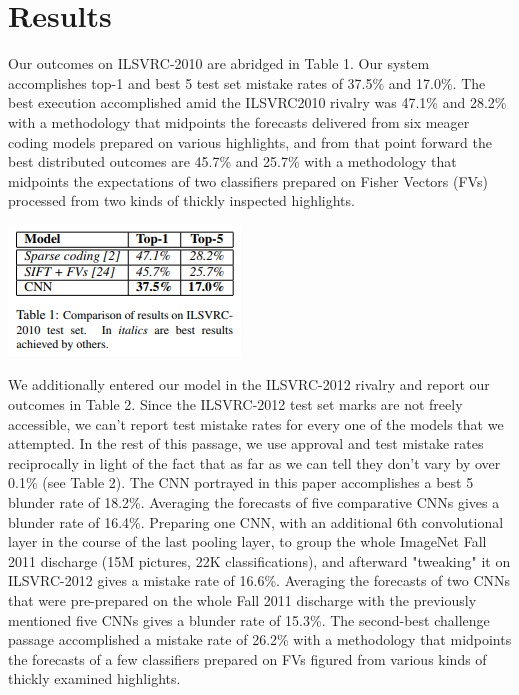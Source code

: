 \documentclass[12pt]{article}
\begin{document}
\section*{Results}
\hspace*{10mm}Our outcomes on ILSVRC-2010 are abridged in Table 1. Our system accomplishes top-1 and best 5 test set mistake rates of 37.5\% and 17.0\%. The best execution accomplished amid the ILSVRC2010 rivalry was 47.1\% and 28.2\% with a methodology that midpoints the forecasts delivered from six meager coding models prepared on various highlights, and from that point forward the best distributed outcomes are 45.7\% and 25.7\% with a methodology that midpoints the expectations of two classifiers prepared on Fisher Vectors (FVs) processed from two kinds of thickly inspected highlights.
\begin{center}
\includegraphics[scale=1]{t1}
\end{center}
\hspace*{10mm}We additionally entered our model in the ILSVRC-2012 rivalry and report our outcomes in Table 2. Since the ILSVRC-2012 test set marks are not freely accessible, we can't report test mistake rates for every one of the models that we attempted. In the rest of this passage, we use approval and test mistake rates reciprocally in light of the fact that as far as we can tell they don't vary by over 0.1\% (see Table 2). The CNN portrayed in this paper accomplishes a best 5 blunder rate of 18.2\%. Averaging the forecasts of five comparative CNNs gives a blunder rate of 16.4\%. Preparing one CNN, with an additional 6th convolutional layer in the course of the last pooling layer, to group the whole ImageNet Fall 2011 discharge (15M pictures, 22K classifications), and afterward "tweaking" it on ILSVRC-2012 gives a mistake rate of 16.6\%. Averaging the forecasts of two CNNs that were pre-prepared on the whole Fall 2011 discharge with the previously mentioned five CNNs gives a blunder rate of 15.3\%. The second-best challenge passage accomplished a mistake rate of 26.2\% with a methodology that midpoints the forecasts of a few classifiers prepared on FVs figured from various kinds of thickly examined highlights.
\end{document}
